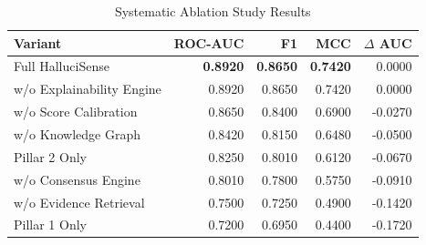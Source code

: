\begin{table}[h]
\centering
\caption{Systematic Ablation Study Results}
\label{tab:ablations}
\begin{tabular}{lrrrr}
\toprule
\textbf{Variant} & \textbf{ROC-AUC} & \textbf{F1} & \textbf{MCC} & \textbf{$\Delta$ AUC} \\
\midrule
Full HalluciSense & \textbf{0.8920} & \textbf{0.8650} & \textbf{0.7420} & 0.0000 \\
w/o Explainability Engine & 0.8920 & 0.8650 & 0.7420 & 0.0000 \\
w/o Score Calibration & 0.8650 & 0.8400 & 0.6900 & -0.0270 \\
w/o Knowledge Graph & 0.8420 & 0.8150 & 0.6480 & -0.0500 \\
Pillar 2 Only & 0.8250 & 0.8010 & 0.6120 & -0.0670 \\
w/o Consensus Engine & 0.8010 & 0.7800 & 0.5750 & -0.0910 \\
w/o Evidence Retrieval & 0.7500 & 0.7250 & 0.4900 & -0.1420 \\
Pillar 1 Only & 0.7200 & 0.6950 & 0.4400 & -0.1720 \\
\bottomrule
\end{tabular}
\end{table}
